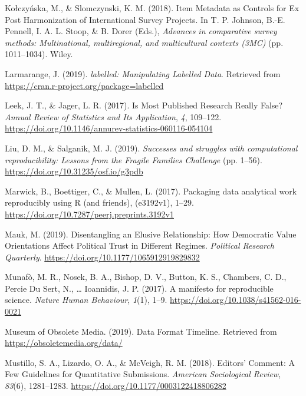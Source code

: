 \documentclass[12pt,]{article}
\begin{document}
\leavevmode\hypertarget{ref-KolczynskaSlomczynski2018}{}%
Kołczyńska, M., \& Slomczynski, K. M. (2018). Item Metadata as Controls for Ex Post Harmonization of International Survey Projects. In T. P. Johnson, B.-E. Pennell, I. A. L. Stoop, \& B. Dorer (Eds.), \emph{Advances in comparative survey methods: Multinational, multiregional, and multicultural contexts (3MC)} (pp. 1011--1034). Wiley.

\leavevmode\hypertarget{ref-labelled}{}%
Larmarange, J. (2019). \emph{labelled: Manipulating Labelled Data}. Retrieved from \url{https://cran.r-project.org/package=labelled}

\leavevmode\hypertarget{ref-Leek2017}{}%
Leek, J. T., \& Jager, L. R. (2017). Is Most Published Research Really False? \emph{Annual Review of Statistics and Its Application}, \emph{4}, 109--122. \url{https://doi.org/10.1146/annurev-statistics-060116-054104}

\leavevmode\hypertarget{ref-Liu2019}{}%
Liu, D. M., \& Salganik, M. J. (2019). \emph{Successes and struggles with computational reproducibility: Lessons from the Fragile Families Challenge} (pp. 1--56). \url{https://doi.org/10.31235/osf.io/g3pdb}

\leavevmode\hypertarget{ref-Marwick2017}{}%
Marwick, B., Boettiger, C., \& Mullen, L. (2017). Packaging data analytical work reproducibly using R (and friends), (e3192v1), 1--29. \url{https://doi.org/10.7287/peerj.preprints.3192v1}

\leavevmode\hypertarget{ref-Mauk2019}{}%
Mauk, M. (2019). Disentangling an Elusive Relationship: How Democratic Value Orientations Affect Political Trust in Different Regimes. \emph{Political Research Quarterly}. \url{https://doi.org/10.1177/1065912919829832}

\leavevmode\hypertarget{ref-Munafo2017}{}%
Munafò, M. R., Nosek, B. A., Bishop, D. V., Button, K. S., Chambers, C. D., Percie Du Sert, N., \ldots{} Ioannidis, J. P. (2017). A manifesto for reproducible science. \emph{Nature Human Behaviour}, \emph{1}(1), 1--9. \url{https://doi.org/10.1038/s41562-016-0021}

\leavevmode\hypertarget{ref-MuseumofObsoleteMedia2019}{}%
Museum of Obsolete Media. (2019). Data Format Timeline. Retrieved from \url{https://obsoletemedia.org/data/}

\leavevmode\hypertarget{ref-Mustillo2018}{}%
Mustillo, S. A., Lizardo, O. A., \& McVeigh, R. M. (2018). Editors' Comment: A Few Guidelines for Quantitative Submissions. \emph{American Sociological Review}, \emph{83}(6), 1281--1283. \url{https://doi.org/10.1177/0003122418806282}
\end{document}
